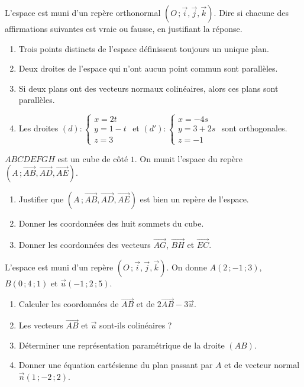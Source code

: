\documentclass[11pt]{article}
\begin{document}
\begin{exercice}
L'espace est muni d'un repère orthonormal $(O\,;\vec{i},\vec{j},\vec{k})$. Dire si chacune des affirmations suivantes est vraie ou fausse, en justifiant la réponse.
\begin{enumerate}
\item Trois points distincts de l'espace définissent toujours un unique plan.
\item Deux droites de l'espace qui n'ont aucun point commun sont parallèles.
\item Si deux plans ont des vecteurs normaux colinéaires, alors ces plans sont parallèles.
\item Les droites $(d) : \begin{cases} x = 2t \\ y = 1 - t \\ z = 3 \end{cases}$ et $(d') : \begin{cases} x = -4s \\ y = 3 + 2s \\ z = -1 \end{cases}$ sont orthogonales.
\end{enumerate}
\end{exercice}

\begin{exercice}
$ABCDEFGH$ est un cube de côté $1$. On munit l'espace du repère $(A\,;\overrightarrow{AB},\overrightarrow{AD},\overrightarrow{AE})$.
\begin{enumerate}
\item Justifier que $(A\,;\overrightarrow{AB},\overrightarrow{AD},\overrightarrow{AE})$ est bien un repère de l'espace.
\item Donner les coordonnées des huit sommets du cube.
\item Donner les coordonnées des vecteurs $\overrightarrow{AG}$, $\overrightarrow{BH}$ et $\overrightarrow{EC}$.
\end{enumerate}
\end{exercice}

\begin{exercice}
L'espace est muni d'un repère $(O\,;\vec{i},\vec{j},\vec{k})$. On donne $A(2\,;-1\,;3)$, $B(0\,;4\,;1)$ et $\vec{u}(-1\,;2\,;5)$.
\begin{enumerate}
\item Calculer les coordonnées de $\overrightarrow{AB}$ et de $2\overrightarrow{AB} - 3\vec{u}$.
\item Les vecteurs $\overrightarrow{AB}$ et $\vec{u}$ sont-ils colinéaires ?
\item Déterminer une représentation paramétrique de la droite $(AB)$.
\item Donner une équation cartésienne du plan passant par $A$ et de vecteur normal $\vec{n}(1\,;-2\,;2)$.
\end{enumerate}
\end{exercice}
\end{document}

